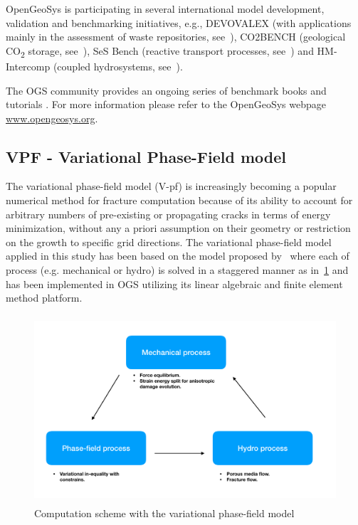 OpenGeoSys is participating in several international model development, validation and benchmarking initiatives, e.g., DEVOVALEX (with applications mainly in the assessment of waste repositories, see~\cite{Birkholzer2018}), CO2BENCH (geological CO\textsubscript{2} storage, see~\cite{Kolditz2012613}), SeS Bench (reactive transport processes, see~\cite{Steefel:2015}) and HM-Intercomp (coupled hydrosystems, see~\cite{Maxwell:2015}).

The OGS community provides an ongoing series of benchmark books \cite{BB4} and tutorials \cite{Lehmann:2018}. For more information please refer to the OpenGeoSys webpage \url{www.opengeosys.org}.

\subsection{VPF - Variational Phase-Field model}
The variational phase-field model (V-pf) is increasingly becoming a popular numerical method for fracture computation because of its ability to account for arbitrary numbers of pre-existing or propagating cracks in terms of energy minimization, without any a priori assumption on their geometry or restriction on the growth to specific grid directions.
The variational phase-field model applied in this study has been based on the model proposed by~\cite{Bourdin2012, Chukwudozie2019} where each of process (e.g. mechanical or hydro) is solved in a staggered manner as in~\ref{fig:Keita_VPF_code} and has been implemented in OGS utilizing its linear algebraic and finite element method platform.

\begin{figure}[!ht]
\centering
\includegraphics[width=12cm,height=7cm]{figures/VPF_code.png}
\caption{Computation scheme with the variational phase-field model}
\label{fig:Keita_VPF_code}
\end{figure} 

